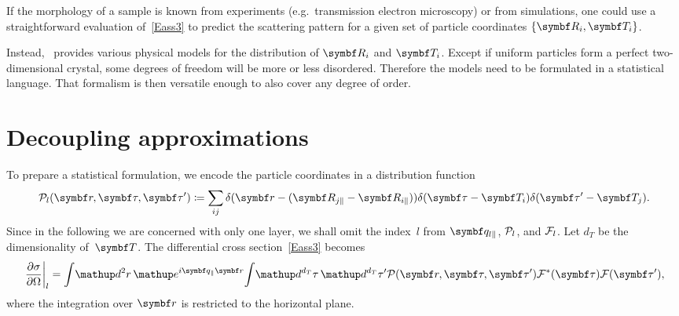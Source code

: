 If the morphology of a sample is known from experiments
(e.g.\ transmission electron microscopy) or from simulations,
one could use a straightforward evaluation of~\cref{Eass3}
to predict the scattering pattern
for a given set of particle coordinates $\{\R_i,\v{T}_i\}$.

\addtocounter{footnote}{1}

Instead, \BornAgain\ provides various physical models
for the distribution of $\R_i$ and $\v{T}_i$.
Except if uniform particles form a perfect two-dimensional crystal,
some degrees of freedom will be more or less disordered.
Therefore the models need to be formulated in a statistical language.
That formalism is then versatile enough to also cover any degree of order.

\section{Decoupling approximations}\label{Spartidis}

To prepare a statistical formulation,
we encode the particle coordinates in a distribution function
%
%
%
\begin{equation}\label{EPDdeltas}
  \PD_{l}(\r,\v\tau,\v\tau')
  \coloneqq \sum_{ij} \delta(\r-(\R_{j\plll}-\R_{i\plll}))
  \delta(\v\tau-\v{T}_i)\delta(\v\tau'-\v{T}_j).
\end{equation}
Since in the following we are concerned with only one layer,
we shall omit the index~$l$ from $\q_{l\plll}$, $\mathcal{P}_l$, and $\mathcal{F}_l$.
Let $d_T$ be the dimensionality of~$\v{T}$.
The differential cross section~\cref{Eass3} becomes
\begin{equation}\label{Epdm1}
  \left.\frac{\partial\sigma}{\partial\Omega}\right|_l
  =
  \int\!\d^2r\,   \e^{i\q_{\plll}\r}\!
  \int\! \d^{d_T}\tau\, \d^{d_T}\tau'
    \PD(\r,\v\tau,\v\tau')
    \FD^*(\v\tau) \FD(\v\tau'),
\end{equation}
where the integration over $\r$ is restricted to the horizontal plane.

